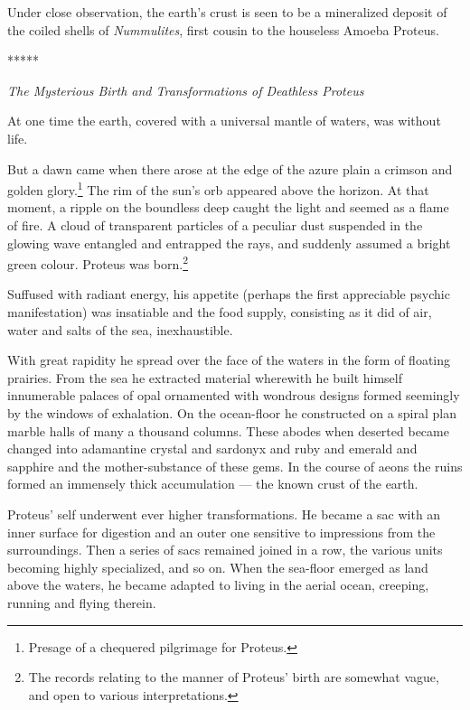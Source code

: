 \documentclass[a4paper, 12pt, oneside, landscape]{article}
\begin{document}
Under close observation, the earth's crust is seen to be a mineralized deposit of the coiled shells of \emph{Nummulites}, first cousin to the houseless Amoeba Proteus.

\centerline{*\hspace{15mm}*\hspace{15mm}*\hspace{15mm}*\hspace{15mm}*}
\bigskip

\centerline{\emph{The Mysterious Birth and Transformations of Deathless Proteus}}

At one time the earth, covered with a universal mantle of waters, was without life.

But a dawn came when there arose at the edge of the azure plain a crimson and golden glory.\footnote{Presage of a chequered pilgrimage for Proteus.} The rim of the sun's orb appeared above the horizon. At that moment, a ripple on the boundless deep caught the light and seemed as a flame of fire. A cloud of transparent particles of a peculiar dust suspended in the glowing wave entangled and entrapped the rays, and suddenly assumed a bright green colour. Proteus was born.\footnote{The records relating to the manner of Proteus' birth are somewhat vague, and open to various interpretations.}

Suffused with radiant energy, his appetite (perhaps the first appreciable psychic manifestation) was insatiable and the food supply, consisting as it did of air, water and salts of the sea, inexhaustible.

With great rapidity he spread over the face of the waters in the form of floating prairies. From the sea he extracted material wherewith he built himself innumerable palaces of opal ornamented with wondrous designs formed seemingly by the windows of exhalation. On the ocean-floor he constructed on a spiral plan marble halls of many a thousand columns. These abodes when deserted became changed into adamantine crystal and sardonyx and ruby and emerald and sapphire and the mother-substance of these gems. In the course of aeons the ruins formed an immensely thick accumulation --- the known crust of the earth.

Proteus' self underwent ever higher transformations. He became a sac with an inner surface for digestion and an outer one sensitive to impressions from the surroundings. Then a series of sacs remained joined in a row, the various units becoming highly specialized, and so on. When the sea-floor emerged as land above the waters, he became adapted to living in the aerial ocean, creeping, running and flying therein.
\end{document}
